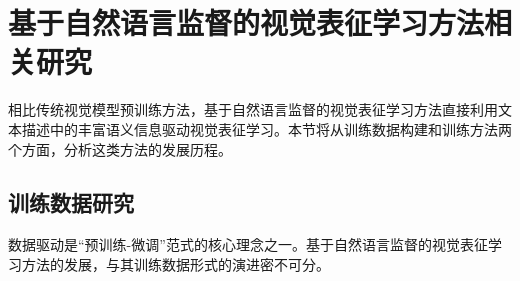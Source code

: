 
\section{基于自然语言监督的视觉表征学习方法相关研究}
\label{sec:vl-related}
相比传统视觉模型预训练方法，基于自然语言监督的视觉表征学习方法直接利用文本描述中的丰富语义信息驱动视觉表征学习。本节将从训练数据构建和训练方法两个方面，分析这类方法的发展历程。%

\subsection{训练数据研究}
数据驱动是“预训练-微调”范式的核心理念之一。基于自然语言监督的视觉表征学习方法的发展，与其训练数据形式的演进密不可分。

